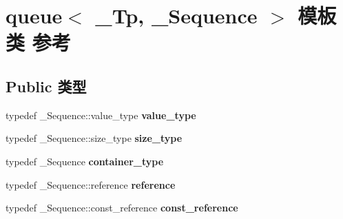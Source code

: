 \hypertarget{classqueue}{}\section{queue$<$ \+\_\+\+Tp, \+\_\+\+Sequence $>$ 模板类 参考}
\label{classqueue}
\subsection*{Public 类型}
\begin{DoxyCompactItemize}
\item 
\mbox{\label{classqueue_a311d30fc595b1858bd402ae19be3bdfe}} 
typedef \+\_\+\+Sequence\+::value\+\_\+type {\bfseries value\+\_\+type}
\item 
\mbox{\label{classqueue_ab7fdba8f4086c4df633e644d77098df7}} 
typedef \+\_\+\+Sequence\+::size\+\_\+type {\bfseries size\+\_\+type}
\item 
\mbox{\label{classqueue_a321b16cd9a50953e7dac3665bf295650}} 
typedef \+\_\+\+Sequence {\bfseries container\+\_\+type}
\item 
\mbox{\label{classqueue_a0700a788e756477381bf955d95e1152c}} 
typedef \+\_\+\+Sequence\+::reference {\bfseries reference}
\item 
\mbox{\label{classqueue_a9fceb7844ed8aa41c83426717fcd6986}} 
typedef \+\_\+\+Sequence\+::const\+\_\+reference {\bfseries const\+\_\+reference}
\end{DoxyCompactItemize}

